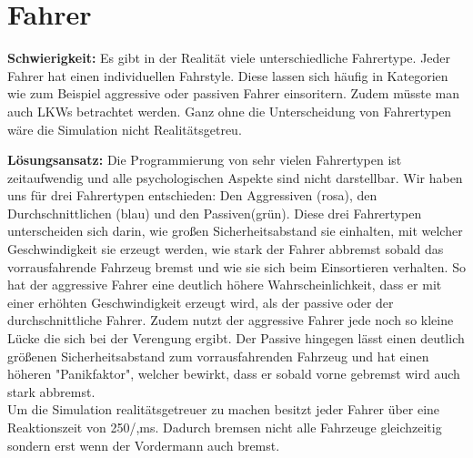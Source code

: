 \section{Fahrer}
\textbf{Schwierigkeit:} Es gibt in der Realität viele unterschiedliche Fahrertype. Jeder Fahrer hat einen individuellen Fahrstyle. Diese lassen sich häufig in Kategorien wie zum Beispiel aggressive oder passiven Fahrer einsoritern. Zudem müsste man auch LKWs betrachtet werden. Ganz ohne die Unterscheidung von Fahrertypen wäre die Simulation nicht Realitätsgetreu.
\begin{addmargin}[25pt]{0pt}
	\item \textbf{Lösungsansatz:} Die Programmierung von sehr vielen Fahrertypen ist zeitaufwendig und alle psychologischen Aspekte sind nicht darstellbar. Wir haben uns für drei Fahrertypen entschieden: Den Aggressiven (rosa), den Durchschnittlichen (blau) und den Passiven(grün). Diese drei Fahrertypen unterscheiden sich darin, wie großen Sicherheitsabstand sie einhalten, mit welcher Geschwindigkeit sie erzeugt werden, wie stark der Fahrer abbremst sobald das vorrausfahrende Fahrzeug bremst und wie sie sich beim Einsortieren verhalten. So hat der aggressive Fahrer eine deutlich höhere Wahrscheinlichkeit, dass er mit einer erhöhten Geschwindigkeit erzeugt wird, als der passive oder der durchschnittliche Fahrer. Zudem nutzt der aggressive Fahrer jede noch so kleine Lücke die sich bei der Verengung ergibt. Der Passive hingegen lässt einen deutlich größenen Sicherheitsabstand zum vorrausfahrenden Fahrzeug und hat einen höheren "Panikfaktor", welcher bewirkt, dass er sobald vorne gebremst wird auch stark abbremst.\\
	Um die Simulation realitätsgetreuer zu machen besitzt jeder Fahrer über eine Reaktionszeit von 250/,ms. Dadurch bremsen nicht alle Fahrzeuge gleichzeitig sondern erst wenn der Vordermann auch bremst.\\
\end{addmargin}